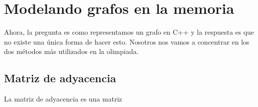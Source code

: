 \chapter{Modelando grafos en la memoria}

Ahora, la pregunta es como representamos un grafo en C++ y la respuesta es que no existe una única forma de hacer esto. Nosotros nos vamos a concentrar en los dos métodos más utilizados en la olimpiada.


\section{Matriz de adyacencia}

La matriz de adyacencia es una matriz 